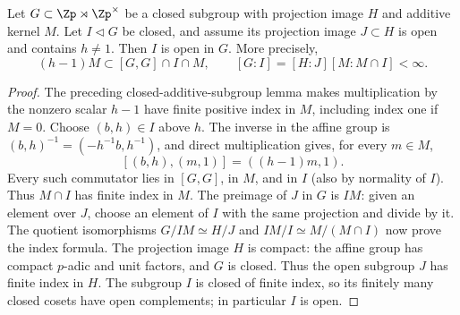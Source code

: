 \begin{lemma}
\label{ft:affine-commutator}
\leanok
Let $G\subset\Zp\rtimes\Zp^\times$ be a closed subgroup with projection
image $H$ and additive kernel $M$. Let $I\triangleleft G$ be closed, and assume its projection image
$J\subset H$ is open and contains $h\ne1$. Then $I$ is open in $G$.
More precisely,
\[
 (h-1)M\subset [G,G]\cap I\cap M,
 \qquad [G:I]=[H:J][M:M\cap I]<\infty.
\]
\end{lemma}
\begin{proof}
The preceding closed-additive-subgroup lemma makes multiplication by
the nonzero scalar $h-1$ have finite positive index in $M$, including
index one if $M=0$. Choose $(b,h)\in I$ above $h$.
The inverse in the affine group is $(b,h)^{-1}=(-h^{-1}b,h^{-1})$,
and direct multiplication gives, for every $m\in M$,
\[
 [(b,h),(m,1)]=((h-1)m,1).
\]
Every such commutator lies in $[G,G]$, in $M$, and in $I$ (also by
normality of $I$). Thus $M\cap I$ has finite index in $M$.
The preimage of $J$ in $G$ is $IM$: given an element over $J$, choose
an element of $I$ with the same projection and divide by it.
The quotient isomorphisms
$G/IM\simeq H/J$ and $IM/I\simeq M/(M\cap I)$ now prove the index
formula. The projection image $H$ is compact: the affine group has compact
$p$-adic and unit factors, and $G$ is closed. Thus the open subgroup
$J$ has finite index in $H$. The subgroup $I$ is closed of finite index,
so its finitely many closed cosets have open complements; in particular
$I$ is open.
\end{proof}

